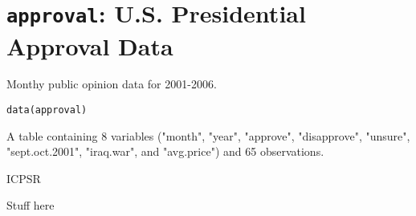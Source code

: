  \section{{\tt approval}: U.S. Presidential Approval Data}\label{ss:approval}
\begin{Description}\relax
Monthy public opinion data for 2001-2006.
\end{Description}
\begin{Usage}
\begin{verbatim}data(approval)\end{verbatim}
\end{Usage}
\begin{Format}\relax
A table containing 8 variables ("month", "year", "approve", 
"disapprove", "unsure", "sept.oct.2001", "iraq.war", and "avg.price")
and 65 observations.
\end{Format}
\begin{Source}\relax
ICPSR
\end{Source}
\begin{References}\relax
Stuff here
\end{References}


